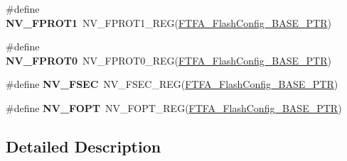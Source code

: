 \begin{DoxyCompactItemize}
\item 
\hypertarget{group___n_v___register___accessor___macros_ga35eb345943dea70476ecc9f1cc3db473}{}\#define {\bfseries N\+V\+\_\+\+F\+P\+R\+O\+T1}~N\+V\+\_\+\+F\+P\+R\+O\+T1\+\_\+\+R\+E\+G(\hyperlink{group___n_v___peripheral_ga3458652dfc38239f92682556e63596b5}{F\+T\+F\+A\+\_\+\+Flash\+Config\+\_\+\+B\+A\+S\+E\+\_\+\+P\+T\+R})\label{group___n_v___register___accessor___macros_ga35eb345943dea70476ecc9f1cc3db473}

\item 
\hypertarget{group___n_v___register___accessor___macros_gabd1755172d62e3c49cb9e79d2065a147}{}\#define {\bfseries N\+V\+\_\+\+F\+P\+R\+O\+T0}~N\+V\+\_\+\+F\+P\+R\+O\+T0\+\_\+\+R\+E\+G(\hyperlink{group___n_v___peripheral_ga3458652dfc38239f92682556e63596b5}{F\+T\+F\+A\+\_\+\+Flash\+Config\+\_\+\+B\+A\+S\+E\+\_\+\+P\+T\+R})\label{group___n_v___register___accessor___macros_gabd1755172d62e3c49cb9e79d2065a147}

\item 
\hypertarget{group___n_v___register___accessor___macros_ga6bdca22aa1e76ebd389ecf4a5d70b93c}{}\#define {\bfseries N\+V\+\_\+\+F\+S\+E\+C}~N\+V\+\_\+\+F\+S\+E\+C\+\_\+\+R\+E\+G(\hyperlink{group___n_v___peripheral_ga3458652dfc38239f92682556e63596b5}{F\+T\+F\+A\+\_\+\+Flash\+Config\+\_\+\+B\+A\+S\+E\+\_\+\+P\+T\+R})\label{group___n_v___register___accessor___macros_ga6bdca22aa1e76ebd389ecf4a5d70b93c}

\item 
\hypertarget{group___n_v___register___accessor___macros_gad508c386413905d31c12a2319fa355e3}{}\#define {\bfseries N\+V\+\_\+\+F\+O\+P\+T}~N\+V\+\_\+\+F\+O\+P\+T\+\_\+\+R\+E\+G(\hyperlink{group___n_v___peripheral_ga3458652dfc38239f92682556e63596b5}{F\+T\+F\+A\+\_\+\+Flash\+Config\+\_\+\+B\+A\+S\+E\+\_\+\+P\+T\+R})\label{group___n_v___register___accessor___macros_gad508c386413905d31c12a2319fa355e3}

\end{DoxyCompactItemize}


\subsection{Detailed Description}
